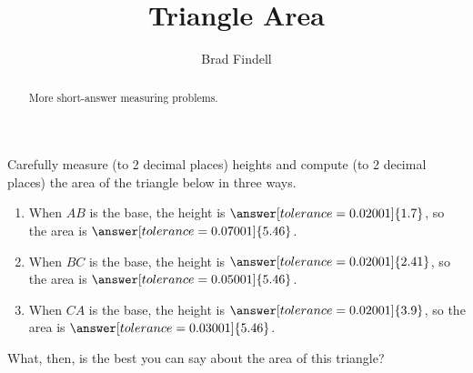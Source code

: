 \documentclass[nooutcomes]{ximera}
\title{Triangle Area}
\author{Brad Findell}
\begin{document}
\begin{abstract}
More short-answer measuring problems.
\end{abstract}
\maketitle

\begin{problem}
Carefully measure (to 2 decimal places) heights and compute (to 2 decimal places) the area of the triangle below in three ways.  
\begin{center}  
\end{center}
\begin{enumerate}
\item When $AB$ is the base, the height is $\answer[tolerance=0.02001]{1.7}$, so the area is $\answer[tolerance=0.07001]{5.46}$.
\item When $BC$ is the base, the height is $\answer[tolerance=0.02001]{2.41}$, so the area is $\answer[tolerance=0.05001]{5.46}$.
\item When $CA$ is the base, the height is $\answer[tolerance=0.02001]{3.9}$, so the area is $\answer[tolerance=0.03001]{5.46}$.
\end{enumerate}
\begin{problem}
What, then, is the best you can say about the area of this triangle? 
\begin{multipleChoice}
\end{multipleChoice}
\end{problem}
\end{problem}
\end{document}
